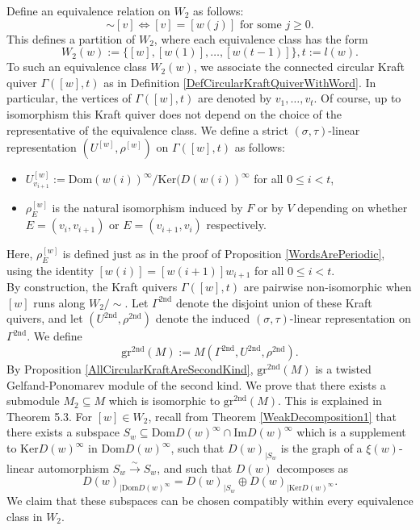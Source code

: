 \documentclass[12pt]{amsart}
\theoremstyle{definition}
\newcommand{\<}{\langle}   %
\renewcommand{\>}{\rangle} %
\begin{document}
Define an equivalence relation on $W_2$ as follows:
\begin{equation*}
    [w] \sim [v] \iff [v] = [w(j)] \text{ for some } j \geq 0.
\end{equation*}
This defines a partition of $W_2$, where each equivalence class has the form 
\begin{equation*}
    W_2(w) := \{[w],[w(1)],\ldots , [w(t-1)]\}, t:= l(w).
\end{equation*}
To such an equivalence class $W_2(w)$, we associate the connected circular Kraft quiver $\Gamma([w],t)$ as in Definition \ref{DefCircularKraftQuiverWithWord}. In particular, the vertices of $\Gamma([w],t)$ are denoted by $v_1,\ldots ,v_t$. Of course, up to isomorphism this Kraft quiver does not depend on the choice of the representative of the equivalence class. We define a strict $(\sigma,\tau)$-linear representation $(U^{[w]}, \rho^{[w]})$ on $\Gamma([w],t)$ as follows:
\begin{itemize}
    \item $U^{[w]}_{v_{i+1}} := \mathrm{Dom}(w(i))^{\infty} / \mathrm{Ker}(D(w(i))^{\infty}$ for all $0 \leq i < t$,\\
    \item $\rho_E^{[w]}$ is the natural isomorphism induced by $F$ or by $V$ depending on whether $E = (v_i,v_{i+1})$ or $E = (v_{i+1},v_i)$ respectively.
\end{itemize}
Here, $\rho_{E}^{[w]}$ is defined just as in the proof of Proposition \ref{WordsArePeriodic}, using the identity $[w(i)] = [w(i+1)]w_{i+1}$ for all $0 \leq i < t$.\\
By construction, the Kraft quivers $\Gamma([w],t)$ are pairwise non-isomorphic when $[w]$ runs along $W_2/\sim$. Let $\Gamma^{2\mathrm{nd}}$ denote the disjoint union of these Kraft quivers, and let $(U^{2\mathrm{nd}},\rho^{2\mathrm{nd}})$ denote the induced $(\sigma,\tau)$-linear representation on $\Gamma^{2\mathrm{nd}}$. We define 
\begin{equation*}
    \mathrm{gr}^{2\mathrm{nd}}(M) := M(\Gamma^{2\mathrm{nd}},U^{2\mathrm{nd}},\rho^{2\mathrm{nd}}).
\end{equation*}
By Proposition \ref{AllCircularKraftAreSecondKind}, $\mathrm{gr}^{2\mathrm{nd}}(M)$ is a twisted Gelfand-Ponomarev module of the second kind. We prove that there exists a submodule $M_2 \subseteq  M$ which is isomorphic to $\mathrm{gr}^{2\mathrm{nd}}(M)$. This is explained in \cite{gelfand-ponomarev:1968} Theorem 5.3. For $[w] \in W_2$, recall from Theorem \ref{WeakDecomposition1} that there exists a subspace $S_w \subseteq  \mathrm{Dom}D(w)^{\infty} \cap \mathrm{Im}D(w)^{\infty}$ which is a supplement to $\mathrm{Ker}D(w)^{\infty}$ in $\mathrm{Dom}D(w)^{\infty}$, such that $D(w)_{|S_w}$ is the graph of a $\xi(w)$-linear automorphism $S_w \xrightarrow{\sim} S_w$, and such that $D(w)$ decomposes as 
\begin{equation*}
    D(w)_{|\mathrm{Dom}D(w)^{\infty}} = D(w)_{|S_w} \oplus D(w)_{|\mathrm{Ker}D(w)^{\infty}}.
\end{equation*}
We claim that these subspaces can be chosen compatibly within every equivalence class in $W_2$.
\end{document}
